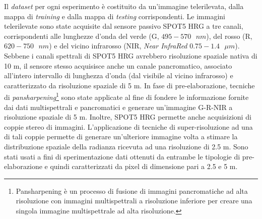 Il \emph{dataset} per ogni esperimento è costituito da un'immagine telerilevata, dalla mappa di \emph{training} e dalla mappa di \emph{testing} corrispondenti.
Le immagini telerilevate sono state acquisite dal sensore passivo \textsc{SPOT5 HRG} a tre canali, corrispondenti alle lunghezze d'onda del verde (G, $495 - 570\text{ } nm$), del rosso (R, $620 -  750\text{ } nm$) e del vicino infrarosso (NIR, \emph{Near InfraRed} $0.75 - 1.4\text{ } \mu m$).
Sebbene i canali spettrali di SPOT5 HRG avrebbero risoluzione spaziale nativa di 10 m, il sensore stesso acquisisce anche un canale pancromatico, associato all'intero intervallo di lunghezza d'onda (dal visibile al vicino infrarosso) e caratterizzato da risoluzione spaziale di 5 m. In fase di pre-elaborazione, tecniche di \emph{pansharpening}\footnote{Pansharpening è un processo di fusione di immagini pancromatiche ad alta risoluzione con immagini multispettrali a risoluzione inferiore per creare una singola immagine multispettrale ad alta risoluzione.} sono state applicate al fine di fondere le informazione fornite dai dati multispettrali e pancromatici e generare un'immagine G-R-NIR a risoluzione spaziale di 5 m. Inoltre, SPOT5 HRG permette anche acquisizioni di coppie stereo di immagini. L'applicazione di tecniche di super-risoluzione ad una di tali coppie permette di generare un'ulteriore immagine volta a stimare la distribuzione spaziale della radianza ricevuta ad una risoluzione di 2.5 m. Sono stati usati a fini di sperimentazione dati ottenuti da entrambe le tipologie di pre-elaborazione e quindi caratterizzati da pixel di dimensione pari a 2.5 e 5 m.
 

